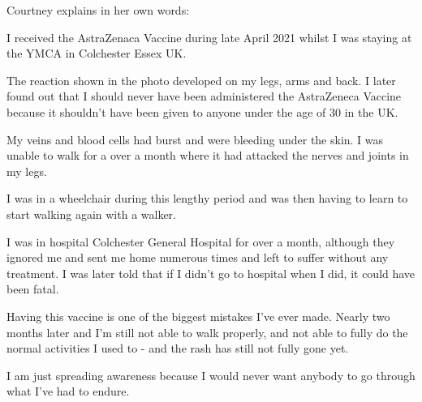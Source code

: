 Courtney explains in her own words:

I received the AstraZenaca Vaccine during late April 2021 whilst I was staying
at the YMCA in Colchester Essex UK.

The reaction shown in the photo developed on my legs, arms and back. I later
found out that I should never have been administered the AstraZeneca Vaccine
because it shouldn't have been given to anyone under the age of 30 in the UK.

My veins and blood cells had burst and were bleeding under the skin. I was
unable to walk for a over a month where it had attacked the nerves and joints in
my legs.

I was in a wheelchair during this lengthy period and was then having to learn to
start walking again with a walker.

I was in hospital Colchester General Hospital for over a month, although they
ignored me and sent me home numerous times and left to suffer without any
treatment. I was later told that if I didn’t go to hospital when I did, it could
have been fatal.

Having this vaccine is one of the biggest mistakes I’ve ever made. Nearly two
months later and I'm still not able to walk properly, and not able to fully do
the normal activities I used to - and the rash has still not fully gone yet.

I am just spreading awareness because I would never want anybody to go through
what I've had to endure.

